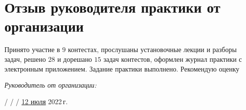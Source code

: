 \section{Отзыв руководителя практики от организации}

Принято участие в $9$ контестах, прослушаны установочные лекции и разборы задач, решено $28$ и дорешано $15$ задач контестов, оформлен журнал практики с электронным приложением. Задание практики выполнено. Рекомендую оценку

\vspace{10pt}

\textit{Руководитель от организации:}

 /  /  / \underline{12 июля} 2022\,г.

\pagebreak
